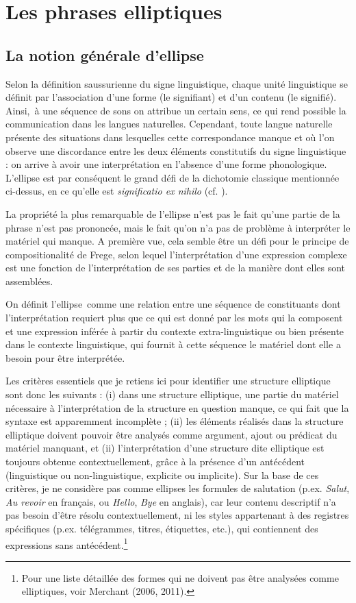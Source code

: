 
\section{Les phrases elliptiques}
\subsection{La notion générale d'ellipse}
Selon la définition saussurienne du signe linguistique, chaque unité linguistique se définit par l'association d'une forme (le signifiant) et d'un contenu (le signifié). Ainsi,~à une séquence de sons on attribue un certain sens, ce qui rend possible la communication dans les langues naturelles. Cependant, toute langue naturelle présente des situations dans lesquelles cette correspondance manque et où l'on observe une discordance entre les deux éléments constitutifs du signe linguistique : on arrive à avoir une interprétation en l'absence d'une forme phonologique. L'ellipse est par conséquent le grand défi de la dichotomie classique mentionnée ci-dessus, en ce qu'elle est \textit{significatio ex nihilo} (cf. \citet{Merchant2006}).

La propriété la plus remarquable de l'ellipse n'est pas le fait qu'une partie de la phrase n'est pas prononcée, mais le fait qu'on n'a pas de problème à interpréter le matériel qui manque. A première vue, cela semble être un défi pour le principe de compositionalité de Frege, selon lequel l'interprétation d'une expression complexe est une fonction de l'interprétation de ses parties et de la manière dont elles sont assemblées. 

On définit l'ellipse~comme une relation entre une séquence de constituants dont l'interprétation requiert plus que ce qui est donné par les mots qui la composent et une expression inférée à partir du contexte extra-linguistique ou bien présente dans le contexte linguistique, qui fournit à cette séquence le matériel dont elle a besoin pour être interprétée. 

Les critères essentiels que je retiens ici pour identifier une structure elliptique sont donc les suivants : (i) dans une structure elliptique, une partie du matériel nécessaire à l'interprétation de la structure en question manque, ce qui fait que la syntaxe est apparemment incomplète ; (ii) les éléments réalisés dans la structure elliptique doivent pouvoir être analysés comme argument, ajout ou prédicat du matériel manquant, et (ii) l'interprétation d'une structure dite elliptique est toujours obtenue contextuellement, grâce à la présence d'un antécédent (linguistique ou non-linguistique, explicite ou implicite). Sur la base de ces critères, je ne considère pas comme ellipses les formules de salutation (p.ex. \textit{Salut}, \textit{Au revoir} en français, ou \textit{Hello}, \textit{Bye} en anglais), car leur contenu descriptif n'a pas besoin d'être résolu contextuellement, ni les styles appartenant à des registres spécifiques (p.ex. télégrammes, titres, étiquettes, etc.), qui contiennent des expressions sans antécédent.\footnote{Pour une liste détaillée des formes qui ne doivent pas être analysées comme elliptiques, voir Merchant (2006, 2011).} 

